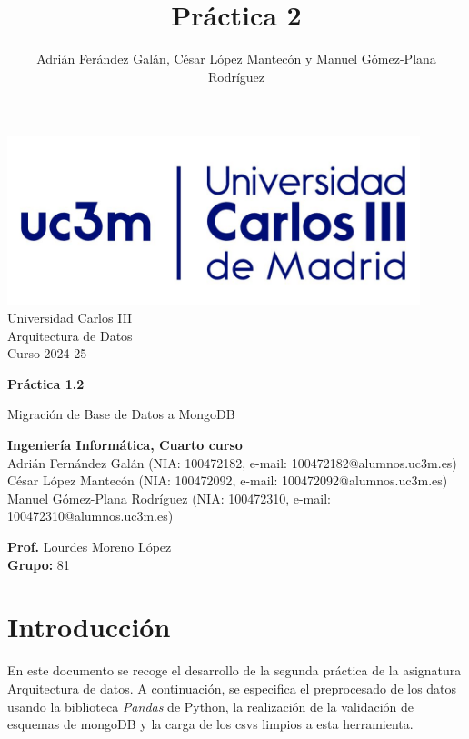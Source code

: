 \documentclass[]{article}
\title{Práctica 2}
\author{Adrián Ferández Galán, César López Mantecón y Manuel Gómez-Plana Rodríguez}
\begin{document}
\begin{titlepage}
    \centering
   \includegraphics[width=0.9\textwidth]{uc3m.jpg} 
    {\Huge Universidad Carlos III\\
    
     \Large Arquitectura de Datos\\
     \vspace{0.5cm}
     Curso 2024-25}
    \vspace{2cm}

    {\Huge \textbf{Práctica 1.2} \par}
    \vspace{0.5cm}
    {\Large Migración de Base de Datos a MongoDB \par}
    \vspace{8cm}

   \textbf{Ingeniería Informática, Cuarto curso}\\
    \vspace{0.2cm} 
    Adrián Fernández Galán       (NIA: 100472182, e-mail: 100472182@alumnos.uc3m.es)\\
    César López Mantecón         (NIA: 100472092, e-mail: 100472092@alumnos.uc3m.es)\\
    Manuel Gómez-Plana Rodríguez (NIA: 100472310, e-mail: 100472310@alumnos.uc3m.es)
    \vspace{0.5cm}

   
    \textbf{Prof.} Lourdes Moreno López\\
    
    \textbf{Grupo: } 81   
    
\end{titlepage}
\newpage

\renewcommand{\contentsname}{\centering Índice}
\tableofcontents

\newpage
\section{Introducción}
\label{sec:introduccion}
En este documento se recoge el desarrollo de la segunda práctica de la asignatura
Arquitectura de datos. A continuación, se especifica el preprocesado de los datos usando
la biblioteca \textit{Pandas} de Python, la realización de la validación de esquemas de
mongoDB y la carga de los csvs limpios a esta herramienta.
\end{document}
